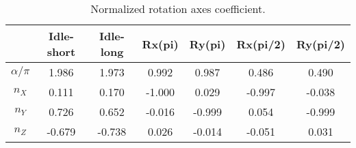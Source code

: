 \begin{table}[h!]
\centering
\caption{Normalized rotation axes coefficient.}
\begin{tabular}{c|*{6}{c}}
\toprule
 & Idle-short & Idle-long & Rx(pi) & Ry(pi) & Rx(pi/2) & Ry(pi/2) \\
\midrule
$\alpha/\pi$ & 1.986 & 1.973 & 0.992 & 0.987 & 0.486 & 0.490 \\
$n_{X}$ & 0.111 & 0.170 & -1.000 & 0.029 & -0.997 & -0.038 \\
$n_{Y}$ & 0.726 & 0.652 & -0.016 & -0.999 & 0.054 & -0.999 \\
$n_{Z}$ & -0.679 & -0.738 & 0.026 & -0.014 & -0.051 & 0.031 \\
\bottomrule
\end{tabular}
\end{table}
